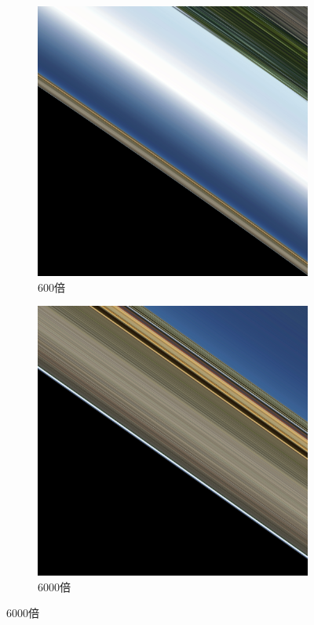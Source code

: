 \documentclass{beamer}
\begin{document}
\begin{frame}
\begin{figure}[H]
        \centering
        \begin{subfigure}{.33\textwidth}
            \centering
            \includegraphics[width=.8\linewidth]{images/zoomin_600x.png}
            \caption{600倍}
            \label{fig:starless_test}
        \end{subfigure}%
        \begin{subfigure}{.33\textwidth}
            \centering
            \includegraphics[width=.8\linewidth]{images/zoomin_6000x.png}
            \caption{6000倍}
            \label{fig:blackness_test}
        \end{subfigure}

\end{figure}
\end{frame}
\end{document}
